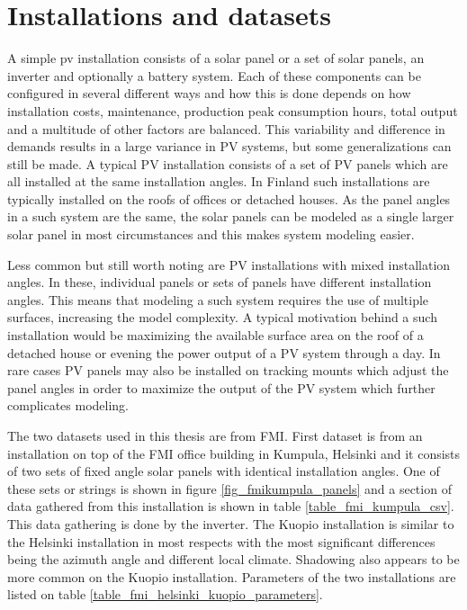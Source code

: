 \chapter{Installations and datasets}

\noindent A simple \gls{pv} installation consists of a solar panel or a set of solar panels, an \gls{inverter} and optionally a battery system. Each of these components can be configured in several different ways and how this is done depends on how installation costs, maintenance, production peak consumption hours, total output and a multitude of other factors are balanced. This variability and difference in demands results in a large variance in PV systems, but some generalizations can still be made. A typical PV installation consists of a set of PV panels which are all installed at the same installation angles. In Finland such installations are typically installed on the roofs of offices or detached houses. As the panel angles in a such system are the same, the solar panels can be modeled as a single larger solar panel in most circumstances and this makes system modeling easier.


Less common but still worth noting are PV installations with mixed installation angles. In these, individual panels or sets of panels have different installation angles. This means that modeling a such system requires the use of multiple surfaces, increasing the model complexity. A typical motivation behind a such installation would be maximizing the available surface area on the roof of a detached house or evening the power output of a PV system through a day. In rare cases PV panels may also be installed on tracking mounts which adjust the panel angles in order to maximize the output of the PV system which further complicates modeling.

The two datasets used in this thesis are from FMI. First dataset is from an installation on top of the FMI office building in Kumpula, Helsinki and it consists of two sets of fixed angle solar panels with identical installation angles. One of these sets or strings is shown in figure \ref{fig_fmikumpula_panels} and a section of data gathered from this installation is shown in table \ref{table_fmi_kumpula_csv}. This data gathering is done by the inverter. The Kuopio installation is similar to the Helsinki installation in most respects with the most significant differences being the azimuth angle and different local climate. Shadowing also appears to be more common on the Kuopio installation. Parameters of the two installations are listed on table \ref{table_fmi_helsinki_kuopio_parameters}.




